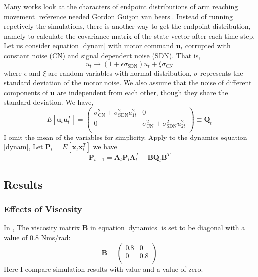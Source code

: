 Many works look at the characters of endpoint distributions of arm reaching movement [reference needed Gordon Guigon van beers]. Instead of running repetively the simulations, there is another way to get the endpoint distribution, namely to calculate the covariance matrix of the state vector after each time step. Let us consider equation \ref{dynam} with motor command $\bm{u}_t$ corrupted with constant noise (CN) and signal dependent noise (SDN). That is,
\begin{equation}
u_t \rightarrow (1 + \epsilon\sigma_{\text{SDN}}) u_t + \xi\sigma_{\text{CN}}
\end{equation}
where $\epsilon$ and $\xi$ are random variables with normal distribution, $\sigma$ represents the standard deviation of the motor noise. We also assume that the noise of different components of $\bm{u}$ are independent from each other, though they share the standard deviation. We have,
\begin{equation}
	E[\bm{u}_t\bm{u}_t^T] = 
	\left(\begin{matrix}
		\sigma_{\text{CN}}^2 + 		\sigma_{\text{SDN}}^2 u_{1t}^2   &  0 \\
		0  &   \sigma_{\text{CN}}^2 + 		\sigma_{\text{SDN}}^2 u_{2t}^2   \\
	\end{matrix}\right)  \equiv \bm{Q}_t
\end{equation}
I omit the mean of the variables for simplicity. Apply to the dynamics equation \ref{dynam}, Let $\bm{P}_t = E[\bm{x}_{t}\bm{x}_{t}^T]$ we have
\begin{equation}
	\bm{P}_{t+1} = \bm{A}_t \bm{P}_t\bm{A}_t^T + \bm{B}\bm{Q}_t\bm{B}^T
\end{equation}

\subsection{Results}\label{results}
\subsubsection{Effects of Viscosity}
In \cite{van2004role}, The viscosity matrix $\bm{B}$ in equation \ref{dynamics} is set to be diagonal with a value of 0.8 Nms/rad:
\begin{equation}
	\bm{B} = 
	\left(\begin{matrix}
	0.8 & 0 \\
	0 & 0.8 \\
	\end{matrix}\right)
\end{equation}
Here I compare simulation results with \cite{van2004role} value and a value of zero.

